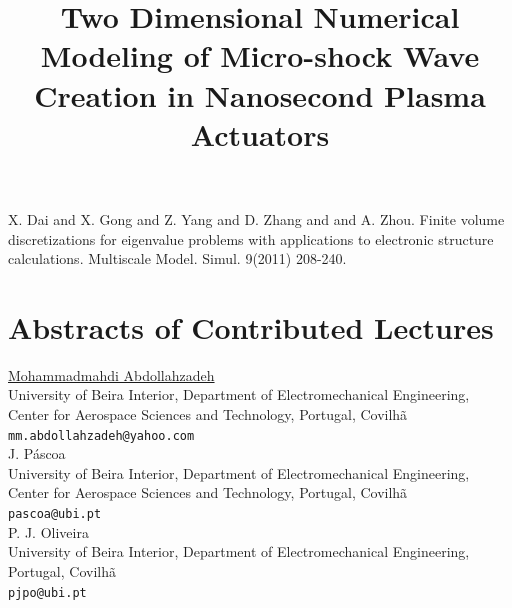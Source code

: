 \documentclass[article, A4, 11pt]{llncs}%
\begin{document}

\begin{thebibliography}{10}
{\sc X. Dai and X. Gong and Z. Yang and D. Zhang and and A. Zhou}. {Finite volume discretizations for eigenvalue problems with applications to electronic structure calculations}. Multiscale Model. Simul. 9(2011) 208-240.
\end{thebibliography} %

\newpage

\part{Abstracts of Contributed Lectures}

\title{Two Dimensional Numerical Modeling of Micro-shock Wave Creation in Nanosecond Plasma Actuators}
 \author{} \institute{}
\maketitle
\begin{center}
{\large \underline{Mohammadmahdi Abdollahzadeh}}\\
University of Beira Interior, Department of Electromechanical Engineering, Center for Aerospace Sciences and Technology, Portugal, Covilhã\\
{\tt mm.abdollahzadeh@yahoo.com}
\\ \vspace{4mm}
{\large J. Páscoa}\\
University of Beira Interior, Department of Electromechanical Engineering, Center for Aerospace Sciences and Technology, Portugal, Covilhã\\
{\tt pascoa@ubi.pt}
\\ \vspace{4mm}
{\large P. J. Oliveira}\\
University of Beira Interior, Department of Electromechanical Engineering, Portugal, Covilhã\\
{\tt pjpo@ubi.pt}
\end{center}
\end{document}
